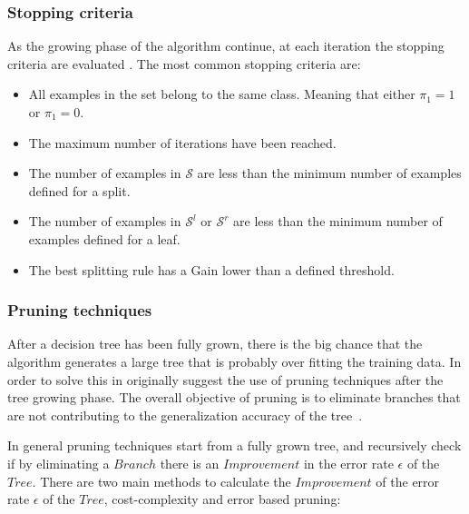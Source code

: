   
\subsubsection{Stopping criteria}
As the growing phase of the algorithm continue, at each iteration the stopping criteria are 
evaluated \citep{Rokach2010}. The most common stopping criteria are:
 \begin{itemize}
   \item All examples in the set belong to the same class. Meaning that either $\pi_1=1$ or 
    $\pi_1=0$.

  \item The maximum number of iterations have been reached.
  
  \item The number of examples in $\mathcal{S}$ are less than the minimum number of examples 
defined for a split.
  
  \item The number of examples in $\mathcal{S}^l$ or $\mathcal{S}^r$ are less than the minimum 
number of examples defined for a leaf.
  
  \item The best splitting rule has a Gain lower than a defined threshold.
\end{itemize}


\subsubsection{Pruning techniques}
After a decision tree has been fully grown, there is the big chance that  the algorithm generates a 
large tree that is probably over fitting the  training data. In order to solve this in 
\citep{Breiman1984a} originally suggest the use of pruning techniques after the tree growing phase.
The overall objective of pruning is to eliminate branches that are not contributing
to the generalization accuracy of the \mbox{tree \citep{Rokach2010}.}
 
In general pruning techniques start from a fully grown tree, and recursively check if by 
eliminating 
a $Branch$ there is an $Improvement$ in the error rate $\epsilon$ of the $Tree$.  There are two 
main 
methods to calculate the $Improvement$ of the error rate $\epsilon$ of the $Tree$, cost-complexity 
and  error based pruning:
  

